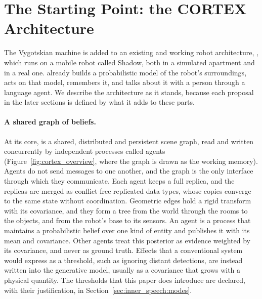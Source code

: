 %

\section{The Starting Point: the CORTEX Architecture}
\label{sec:cortex}

The Vygotskian machine is added to an existing and working robot architecture, \cortex{}, which runs on a mobile
robot called Shadow, both in a simulated apartment and in a real one. \cortex{} already builds a probabilistic model of
the robot's surroundings, acts on that model, remembers it, and talks about it with a person
through a language agent. We describe the architecture as it stands, because each proposal in the later sections is
defined by what it adds to these parts.



\paragraph{A shared graph of beliefs.}
At its core, \cortex{} is a shared, distributed and persistent scene graph, read and written concurrently by independent
processes called agents (Figure~\ref{fig:cortex_overview}, where the graph is drawn as the working memory). Agents
do not send messages to one another, and the graph
is the only interface through which they communicate. Each agent keeps a full replica, and the replicas are merged as
conflict-free replicated data types, whose copies converge to the same state without coordination. Geometric edges
hold a rigid transform with its covariance, and they form a tree from the world through the rooms to the objects, and
from the robot's base to its sensors. An agent is a process that maintains a probabilistic belief over one kind of
entity and publishes it with its mean and covariance. Other agents treat this posterior as evidence weighted by its
covariance, and never as ground truth. Effects that a conventional system would express as a threshold, such as
ignoring distant detections, are instead written into the generative model, usually as a covariance that grows with a
physical quantity. The thresholds that this paper does introduce are declared, with their justification, in
Section~\ref{sec:inner_speech:modes}.

